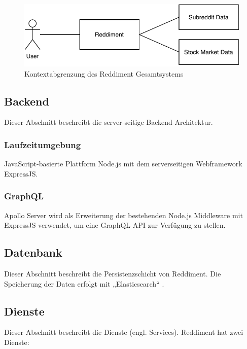 \documentclass[a4paper, 10pt, conference]{IEEEtran}
\begin{document}
\begin{figure}[ht]
	\centering
	\includegraphics[width=\linewidth]{context}
	\caption{Kontextabgrenzung des Reddiment Gesamtsystems}
	\label{fig:context}
\end{figure}

\subsection{Backend} \label{sub:backend}
Dieser Abschnitt beschreibt die server-seitige Backend-Architektur.

\subsubsection{Laufzeitumgebung}

JavaScript-basierte Plattform Node.js mit dem serverseitigen Webframework ExpressJS.

\subsubsection{GraphQL}

Apollo Server wird als Erweiterung der bestehenden Node.js Middleware mit ExpressJS verwendet, um eine GraphQL API zur Verfügung zu stellen.

\subsection{Datenbank} \label{sub:database}

Dieser Abschnitt beschreibt die Persistenzschicht von Reddiment.  Die Speicherung der Daten erfolgt mit „Elasticsearch“ \cite{elasticsearch}.

\subsection{Dienste} \label{sub:services}

Dieser Abschnitt beschreibt die Dienste (engl. Services). Reddiment hat zwei Dienste: 
\end{document}
